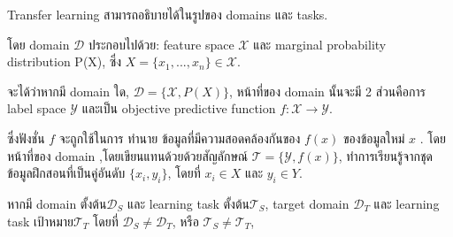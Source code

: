   Transfer learning สามารถอธิบายได้ในรูปของ domains และ tasks. 

  โดย domain ${\mathcal {D}}$ ประกอบไปด้วย: feature space ${\mathcal {X}}$ และ marginal probability distribution P(X),
ซึ่ง ${\displaystyle X=\{x_{1},...,x_{n}\}\in {\mathcal {X}}}$.  

 จะได้ว่าหากมี domain ใด, ${\displaystyle {\mathcal {D}}=\{{\mathcal {X}},P(X)\}}$,
หน้าที่ของ domain นั้นจะมี 2 ส่วนคือการ 
 label space ${\mathcal {Y}}$  และเป็น objective predictive function
${\displaystyle f:{\mathcal {X}}\rightarrow {\mathcal {Y}}}$. 

 ซึ่งฟังชั่น ${\displaystyle f}$  จะถูกใช้ในการ ทำนาย ข้อมูลที่มีความสอดคล้องกันของ  ${\displaystyle f(x)}$   ของข้อมูลใหม่  ${\displaystyle x}$ .   
โดยหน้าที่ของ domain ,โดยเขียนแทนด้วยด้วยสัญลักษณ์   ${\displaystyle {\mathcal {T}}=\{{\mathcal {Y}},f(x)\}}$,
ทำการเรียนรู้จากชุดข้อมูลฝึกสอนที่เป็นคู่อันดับ ${\displaystyle \{x_{i},y_{i}\}}$, โดยที่ ${\displaystyle x_{i}\in {X}}$ และ ${\displaystyle y_{i}\in {Y}}$.

 หากมี domain ตั้งต้น${\displaystyle {\mathcal {D}}_{S}}$ และ learning task ตั้งต้น${\displaystyle {\mathcal {T}}_{S}}$,
target domain  ${\mathcal{D}_{T}}$ และ learning task เป้าหมาย${\mathcal{T}_{T}}$
โดยที่ ${\displaystyle {\mathcal {D}}_{S}\neq {\mathcal {D}}_{T}}$, หรือ ${\displaystyle {\mathcal {T}}_{S}\neq {\mathcal {T}}_{T}}$, 

